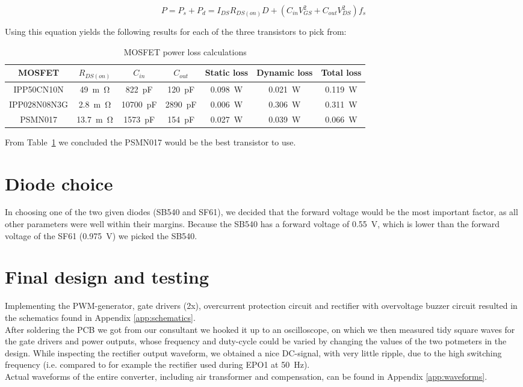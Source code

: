\documentclass[11pt,titlepage]{report}
\begin{document}
\begin{equation}
P = P_{s} + P_{d} = I_{DS}R_{DS(on)}D + (C_{in}V_{GS}^2 + C_{out}V_{DS}^2)f_{s}
\end{equation}

Using this equation yields the following results for each of the three transistors to pick from:

\begin{table}[H]
	\centering
	\caption{MOSFET power loss calculations}
	\label{tab:ass1-power-loss}
	\begin{tabular}{c c c c c c c}
		\hline\hline
		MOSFET & $R_{DS(on)}$ & $C_{in}$ & $C_{out}$ & Static loss & Dynamic loss & Total loss \\
		\hline
		IPP50CN10N & \SI{49}{m\ohm} & \SI{822}{pF} & \SI{120}{pF} & \SI{0.098}{W} & \SI{0.021}{W} & \SI{0.119}{W} \\
		IPP028N08N3G & \SI{2.8}{m\ohm} & \SI{10700}{pF} & \SI{2890}{pF} & \SI{0.006}{W} & \SI{0.306}{W} & \SI{0.311}{W} \\
		PSMN017 & \SI{13.7}{m\ohm} & \SI{1573}{pF} & \SI{154}{pF} & \SI{0.027}{W} & \SI{0.039}{W} & \SI{0.066}{W} \\
		\hline
		\end{tabular}
\end{table}

From Table~\ref{tab:ass1-power-loss} we concluded the PSMN017 would be the best transistor to use.

\section*{Diode choice}
In choosing one of the two given diodes (SB540 and SF61), we decided that the forward voltage would be the most important factor, as all other parameters were well within their margins. Because the SB540 has a forward voltage of \SI{0.55}{V}, which is lower than the forward voltage of the SF61 (\SI{0.975}{V}) we picked the SB540. \cite{SB540-datasheet,SF61-datasheet}

\section*{Final design and testing}
Implementing the PWM-generator, gate drivers (2x), overcurrent protection circuit and rectifier with overvoltage buzzer circuit resulted in the schematics found in Appendix \ref{app:schematics}. %
\\
After soldering the PCB we got from our consultant we hooked it up to an oscilloscope, on which we then measured tidy square waves for the gate drivers and power outputs, whose frequency and duty-cycle could be varied by changing the values of the two potmeters in the design. While inspecting the rectifier output waveform, we obtained a nice DC-signal, with very little ripple, due to the high switching frequency (i.e. compared to for example the rectifier used during EPO1 at \SI{50}{Hz}).
\\
Actual waveforms of the entire converter, including air transformer and compensation, can be found in Appendix \ref{app:waveforms}.
\end{document}
